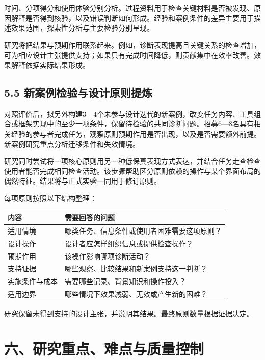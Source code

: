 时间、分项得分和使用体验分别分析。过程资料用于检查关键材料是否被发现、原因解释是否得到核验，以及错误判断如何形成。经验和案例条件的差异主要用于描述效果范围，探索性分析与主要检验分别呈现。

研究将把结果与预期作用联系起来。例如，诊断表现提高且关键关系的检查增加，可为相应设计主张提供支持；如果只有完成时间降低，则贡献集中在效率改善。效果解释依据实际结果形成。

\subsection{5.5 新案例检验与设计原则提炼}

对照评价后，拟另外构建3—4个未参与设计迭代的新案例，改变任务内容、工具组合或框架实现中的至少一项条件，保留待检验的共同诊断问题。招募6—8名具有相关经验的参与者完成任务，观察原则预期作用是否出现，以及是否需要额外前提。新案例研究重点分析迁移条件和失效情境。

研究同时尝试将一项核心原则用另一种低保真表现方式表达，并结合任务走查检查使用者能否完成相同检查活动。该步骤帮助区分原则依赖的操作与某个界面布局的偶然特征。结果将与正式实验一同用于修订原则。

每项原则按照以下结构整理：

\begin{table}[H]
  \centering
  \small
  \begin{tabularx}{\textwidth}{Y Y}
    \toprule
    内容 & 需要回答的问题 \\
    \midrule
    适用情境 & 哪类任务、信息条件或使用者困难需要这项原则？ \\
    设计操作 & 设计者应怎样组织信息或提供检查操作？ \\
    预期作用 & 该操作影响哪项诊断活动？ \\
    支持证据 & 哪些观察、比较结果和新案例支持这一判断？ \\
    实施条件与成本 & 需要哪些记录、背景知识和操作投入？ \\
    适用边界 & 哪些情况下效果减弱、无效或产生新的困难？ \\
    \bottomrule
  \end{tabularx}
\end{table}

研究保留未得到支持的设计主张，并说明其结果。最终原则数量根据证据决定。

\section{六、研究重点、难点与质量控制}

